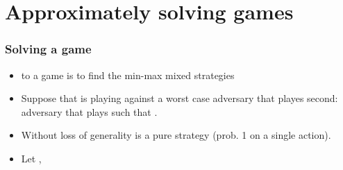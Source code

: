 \documentclass[handout]{beamer}
\begin{document}

\section{Approximately solving games}

\begin{frame}
  \frametitle{Solving a game}
  \begin{itemize}
    \item to  a game is to find the min-max mixed strategies
      \R{$\P,\Q$}
    \item Suppose that \ouralg is playing  against a
      worst case adversary that playes second: 
      adversary that plays  such that \R{$\Qt =
        \arg \maxq \mptq$}.
    \item Without loss of generality \R{$\Qt$} is a pure strategy
      (prob. 1 on a single action).
     \item Let , 
  \end{itemize}
\end{frame}
\end{document}
